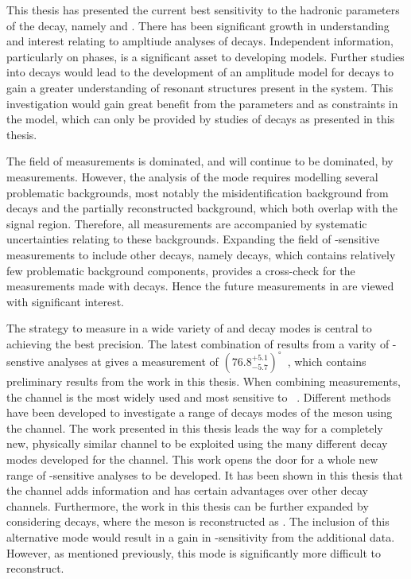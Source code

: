 This thesis has presented the current best sensitivity to the hadronic parameters of the \Bm decay, namely \rb and \deltab. There has been significant growth in understanding and interest relating to ampltiude analyses of \B decays. Independent information, particularly on phases, is a significant asset to developing models. Further studies into \btodkst decays would lead to the development of an amplitude model for \decay{\Bm}{\D\KS\pim} decays to gain a greater understanding of resonant structures present in the \KS\pim system. This investigation would gain great benefit from the parameters \rb and \deltab as constraints in the model, which can only be provided by studies of \btodkst decays as presented in this thesis. 

The field of \Pgamma measurements is dominated, and will continue to be dominated, by \decay{\Bm}{\D\Km} measurements. However, the analysis of the \decay{\Bm}{\D\Km} mode requires modelling several problematic backgrounds, most notably the misidentification background from \decay{\Bm}{\D\pim} decays and the partially reconstructed background, which both overlap with the signal region. Therefore, all \decay{\Bm}{\D\Km} measurements are accompanied by systematic uncertainties relating to these backgrounds. Expanding the field of \Pgamma-sensitive measurements to include other \Bm decays, namely \decay{\Bm}{\D\Kstarm} decays, which contains relatively few problematic background components, provides a cross-check for the \Pgamma measurements made with \decay{\Bm}{\D\Km} decays. Hence the future measurements in \decay{\Bm}{\D\Kstarm} are viewed with significant interest. 

The strategy to measure \Pgamma in a wide variety of \B and \D decay modes is central to achieving the best precision. The latest combination of results from a varity of \Pgamma-senstive analyses at \lhcb gives a measurement of $\left(76.8^{+5.1}_{-5.7}\right)^{\circ}$~\cite{LHCb-CONF-2017-004}, which contains preliminary results from the work in this thesis. When combining \Pgamma measurements, the \decay{\Bm}{\D\Km} channel is the most widely used and most sensitive to \Pgamma~\cite{LHCb-PAPER-2016-032}. Different methods have been developed to investigate a range of decays modes of the \Dz meson using the \decay{\Bm}{\D\Km} channel. The work presented in this thesis leads the way for a completely new, physically similar \decay{\Bm}{\D\Kstarm} channel to be exploited using the many different \D decay modes developed for the \decay{\Bm}{\D\Km} channel. This work opens the door for a whole new range of \Pgamma-sensitive analyses to be developed. It has been shown in this thesis that the \btodkst channel adds information and has certain advantages over other decay channels. Furthermore, the work in this thesis can be further expanded by considering \decay{\Bm}{\D\Kstarm} decays, where the \Kstarm meson is reconstructed as \Km\piz. The inclusion of this alternative mode would result in a gain in \Pgamma-sensitivity from the additional data. However, as mentioned previously, this mode is significantly more difficult to reconstruct.

